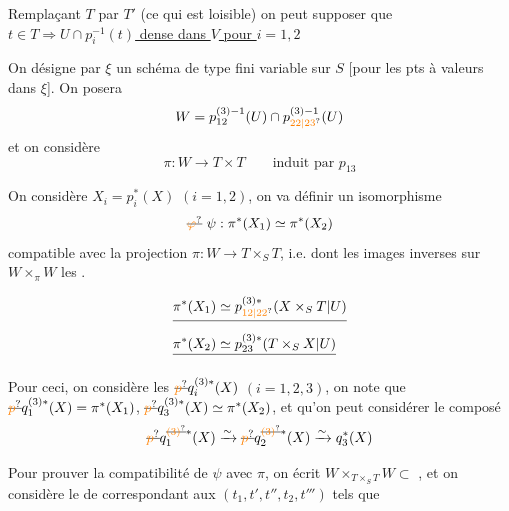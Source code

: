 Remplaçant $T$ par $T'$ (ce qui est loisible) on peut supposer que \uline{$t\in T\Rightarrow U\cap p_i^{-1}(t)$ dense dans $V$ pour $i=1,2$}


On désigne par $\xi$ un schéma de type fini variable sur $S$ [pour  les pts à valeurs dans $\xi$]. On posera
\[
W=p_{12}^{(3)-1}(U)\cap p_{\unsure{22|23}}^{(3)-1}(U)
\]
et on considère
\[
\pi:W\longrightarrow T\times T\qquad\text{induit par }p_{13}
\]

On considère $X_i=p_i^{*}(X)$ $(i=1,2)$, on va définir un isomorphisme
\[
\deleted{\unsure{\varphi}}\ \psi:\pi^{*}(X_1)\simeq\pi^{*}(X_2)
\]
compatible avec la projection $\pi:W\longrightarrow T\times_S T$, i.e. dont les images inverses sur $W\times_{\pi}W$  les .

\[
\begin{aligned}
&\deleted{\pi^{*}(X_1)\simeq p_{\unsure{12|22}}^{(3)*}(X\times_S T|U)}\\
&\deleted{\pi^{*}(X_2)\simeq p_{23}^{(3)*}(T\times_S X|U)}
\end{aligned}
\]

Pour ceci, on considère les $\deleted{\unsure{p}}q_i^{(3)*}(X)$ $(i=1,2,3)$,
on note que $\deleted{\unsure{p}}q_1^{(3)*}(X)=\pi^{*}(X_1)$, $\deleted{\unsure{p}}q_3^{(3)*}(X)\simeq\pi^{*}(X_2)$, et qu'on peut considérer le composé
\[
\deleted{\unsure{p}}q_1^{\deleted{\unsure{(3)}}*}(X)\xrightarrow{\sim}\deleted{\unsure{p}}q_2^{\deleted{\unsure{(3)}}*}(X)\xrightarrow{\sim}q_3^{*}(X)
\]

Pour prouver la compatibilité de $\psi$ avec $\pi$,
on écrit $W\times_{T\times_S T}W\subset$
, et on considère le   de
  correspondant aux  $(t_1,t',t'',t_2,t''')$ tels que 

